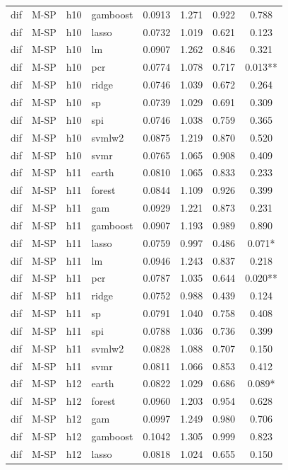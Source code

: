\begin{ThreePartTable}
\begin{longtable}[t]{llclcccc}
dif & M-SP & h10 & gamboost & 0.0913 & 1.271 & 0.922 & 0.788\\
dif & M-SP & h10 & lasso & 0.0732 & 1.019 & 0.621 & 0.123\\
dif & M-SP & h10 & lm & 0.0907 & 1.262 & 0.846 & 0.321\\
dif & M-SP & h10 & pcr & 0.0774 & 1.078 & 0.717 & 0.013**\\
dif & M-SP & h10 & ridge & 0.0746 & 1.039 & 0.672 & 0.264\\
dif & M-SP & h10 & sp & 0.0739 & 1.029 & 0.691 & 0.309\\
dif & M-SP & h10 & spi & 0.0746 & 1.038 & 0.759 & 0.365\\
dif & M-SP & h10 & svmlw2 & 0.0875 & 1.219 & 0.870 & 0.520\\
dif & M-SP & h10 & svmr & 0.0765 & 1.065 & 0.908 & 0.409\\
\addlinespace
dif & M-SP & h11 & earth & 0.0810 & 1.065 & 0.833 & 0.233\\
dif & M-SP & h11 & forest & 0.0844 & 1.109 & 0.926 & 0.399\\
dif & M-SP & h11 & gam & 0.0929 & 1.221 & 0.873 & 0.231\\
dif & M-SP & h11 & gamboost & 0.0907 & 1.193 & 0.989 & 0.890\\
dif & M-SP & h11 & lasso & 0.0759 & 0.997 & 0.486 & 0.071*\\
dif & M-SP & h11 & lm & 0.0946 & 1.243 & 0.837 & 0.218\\
dif & M-SP & h11 & pcr & 0.0787 & 1.035 & 0.644 & 0.020**\\
dif & M-SP & h11 & ridge & 0.0752 & 0.988 & 0.439 & 0.124\\
dif & M-SP & h11 & sp & 0.0791 & 1.040 & 0.758 & 0.408\\
dif & M-SP & h11 & spi & 0.0788 & 1.036 & 0.736 & 0.399\\
dif & M-SP & h11 & svmlw2 & 0.0828 & 1.088 & 0.707 & 0.150\\
dif & M-SP & h11 & svmr & 0.0811 & 1.066 & 0.853 & 0.412\\
\addlinespace
dif & M-SP & h12 & earth & 0.0822 & 1.029 & 0.686 & 0.089*\\
dif & M-SP & h12 & forest & 0.0960 & 1.203 & 0.954 & 0.628\\
dif & M-SP & h12 & gam & 0.0997 & 1.249 & 0.980 & 0.706\\
dif & M-SP & h12 & gamboost & 0.1042 & 1.305 & 0.999 & 0.823\\
dif & M-SP & h12 & lasso & 0.0818 & 1.024 & 0.655 & 0.150\\

\end{longtable}
\end{ThreePartTable}
